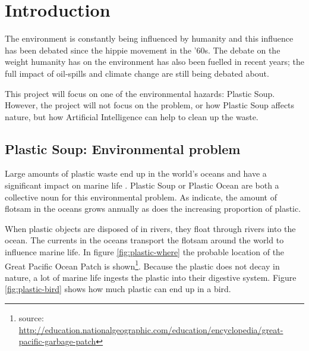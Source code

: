 \section{Introduction}
\label{sec:Introduction}
The environment is constantly being influenced by humanity and this influence has been debated since the hippie movement in the '60s.
The debate on the weight humanity has on the environment has also been fuelled in recent years; the full impact of oil-spills and climate change are still being debated about. \citepos

This project will focus on one of the environmental hazards: Plastic Soup.
However, the project will not focus on the problem, or how Plastic Soup affects nature, but how Artificial Intelligence can help to clean up the waste.



\subsection{Plastic Soup: Environmental problem}
\label{sec:Intro-Plastic Soup}
Large amounts of plastic waste end up in the world's oceans and have a significant impact on marine life \citep{barnes2005drifting}.
Plastic Soup or Plastic Ocean are both a collective noun for this environmental problem.
As \citeauthor{barnes2005drifting} indicate, the amount of flotsam in the oceans grows annually as does the increasing proportion of plastic.

When plastic objects are disposed of in rivers, they float through rivers into the ocean.
The currents in the oceans transport the flotsam around the world to influence marine life.
In figure \ref{fig:plastic-where} the probable location of the Great Pacific Ocean Patch is shown\footnote{source: \url{http://education.nationalgeographic.com/education/encyclopedia/great-pacific-garbage-patch} }.
Because the plastic does not decay in nature, a lot of marine life ingests the plastic into their digestive system. 
Figure \ref{fig:plastic-bird} shows how much plastic can end up in a bird.

